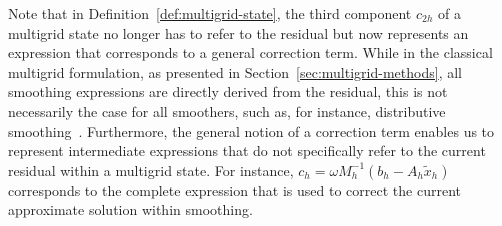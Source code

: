 Note that in Definition~\ref{def:multigrid-state}, the third component $c_{2h}$ of a multigrid state no longer has to refer to the residual but now represents an expression that corresponds to a general correction term.
While in the classical multigrid formulation, as presented in Section~\ref{sec:multigrid-methods}, all smoothing expressions are directly derived from the residual, this is not necessarily the case for all smoothers, such as, for instance, distributive smoothing~\cite{trottenberg2000multigrid}.
Furthermore, the general notion of a correction term enables us to represent intermediate expressions that do not specifically refer to the current residual within a multigrid state.
For instance, $c_h = \omega M_h^{-1} \left( b_h - A_h \tilde{x}_h \right)$ corresponds to the complete expression that is used to correct the current approximate solution within smoothing.
